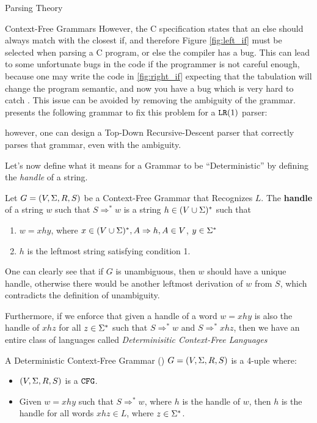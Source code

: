 \begin{section}{Parsing Theory}
\begin{subsection}{Context-Free Grammars}
However, the C specification states that an else should always match with the closest
if, and therefore Figure \ref{fig:left_if} must be selected
when parsing a C program, or else the compiler has a bug. This can lead
to some unfortunate bugs in the code if the programmer is not careful enough,
because one may write the code in \ref{fig:right_if} expecting that the
tabulation will change the program semantic, and now you have a bug which is
very hard to catch \citep{ritchie1988c}. This issue can be avoided by removing the
ambiguity of the grammar. \cite{dragonbook} presents the following grammar
to fix this problem for a $\texttt{LR}(1)$ parser:
\vspace*{-0.5cm}

however, one can design a Top-Down Recursive-Descent parser that correctly
parses that grammar, even with the ambiguity.

Let's now define what it means for a Grammar to be ``Deterministic'' by
defining the \textit{handle} of a string.

\begin{definition}
	Let $G = (V, \Sigma, R, S)$ be a Context-Free Grammar that Recognizes $L$.
	The \textbf{handle} of a string $w$ such that $S \Rightarrow^* w$ is a string
	$h \in (V \cup \Sigma)^*$ such that
	\begin{enumerate}
	  \item $w = xhy$, where $x \in (V \cup \Sigma)^*, A \Rightarrow h, A \in V$,
	  $y \in \Sigma^*$
	  \item $h$ is the leftmost string satisfying condition 1.
	\end{enumerate}
\end{definition}

One can clearly see that if $G$ is unambiguous, then $w$ should have a unique
handle, otherwise there would be another leftmost derivation of $w$ from $S$, which
contradicts the definition of unambiguity.

Furthermore, if we enforce that given a handle of a word $w = xhy$
is also the handle of $xhz $ for all $z \in \Sigma^*$ such that $S \Rightarrow^* w$ and
$S \Rightarrow^* xhz$, then we have an entire
class of languages called \textit{Determinisitic Context-Free Languages}

\begin{definition}
A Deterministic Context-Free Grammar () $G = (V, \Sigma, R, S)$ is a 4-uple where:
	\begin{itemize}
		\item $(V, \Sigma, R, S)$ is a $\texttt{CFG}$.
		\item Given $w = xhy$ such that $S \Rightarrow^* w$, where $h$ is the handle
		of $w$, then $h$ is the handle for all words $xhz \in L$, where $z \in \Sigma^*$.
	\end{itemize}
\end{definition}


\end{subsection}
\end{section}
